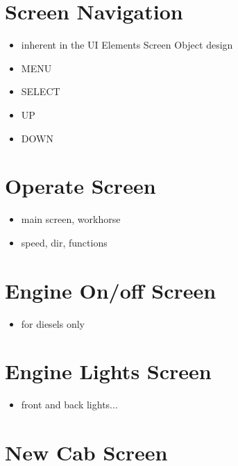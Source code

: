 \section{Screen Navigation}
\begin{itemize}
\begin{itemize}
\item inherent in the UI Elements Screen Object design
\item MENU
\item SELECT
\item UP
\item DOWN
\end{itemize}
\end{itemize}

\section{Operate Screen}
\begin{itemize}
\begin{itemize}
\item main screen, workhorse
\item speed, dir, functions
\end{itemize}
\end{itemize}

\section{Engine On/off Screen}
\begin{itemize}
\begin{itemize}
\item for diesels only
\end{itemize}
\end{itemize}

\section{Engine Lights Screen}
\begin{itemize}
\begin{itemize}
\item front and back lights...
\end{itemize}
\end{itemize}

\section{New Cab Screen}


